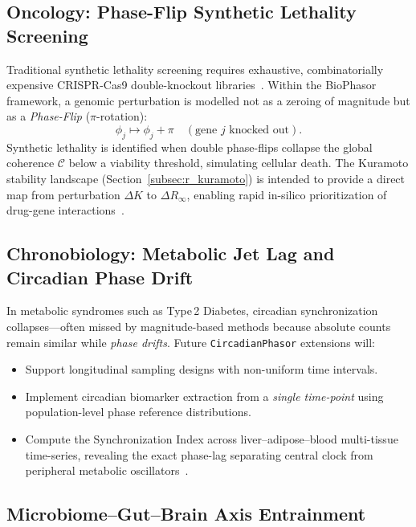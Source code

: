 \documentclass[preprint,12pt,amsmath,amssymb,superscriptaddress,floatfix]{revtex4-2}
\begin{document}
\subsection{Oncology: Phase-Flip Synthetic Lethality Screening}

Traditional synthetic lethality screening requires exhaustive, combinatorially
expensive CRISPR-Cas9 double-knockout libraries~\cite{ref_141,ref_142,ref_143,ref_144}.
Within the BioPhasor framework, a genomic perturbation is modelled not as
a zeroing of magnitude but as a \textit{Phase-Flip} ($\pi$-rotation):
\begin{equation}
    \phi_j \mapsto \phi_j + \pi \quad (\text{gene } j \text{ knocked out}).
\end{equation}
Synthetic lethality is identified when double phase-flips collapse the global
coherence $\mathcal{C}$ below a viability threshold, simulating cellular
death.
The Kuramoto stability landscape (Section~\ref{subsec:r_kuramoto}) is intended
to provide a direct map from perturbation $\Delta K$ to $\Delta R_\infty$, enabling
rapid in-silico prioritization of drug-gene interactions~\cite{ref_145,ref_146,ref_147}.

\subsection{Chronobiology: Metabolic Jet Lag and Circadian Phase Drift}

In metabolic syndromes such as Type\,2 Diabetes, circadian synchronization
collapses---often missed by magnitude-based methods because absolute counts
remain similar while \emph{phase drifts}.
Future \texttt{CircadianPhasor} extensions will:
\begin{itemize}
    \item Support longitudinal sampling designs with non-uniform time intervals.
    \item Implement circadian biomarker extraction from a \emph{single
    time-point} using population-level phase reference distributions.
    \item Compute the Synchronization Index across liver--adipose--blood
    multi-tissue time-series, revealing the exact phase-lag separating central
    clock from peripheral metabolic oscillators~\cite{ref_148,ref_149,ref_150}.
\end{itemize}

\subsection{Microbiome–Gut–Brain Axis Entrainment}
\end{document}
